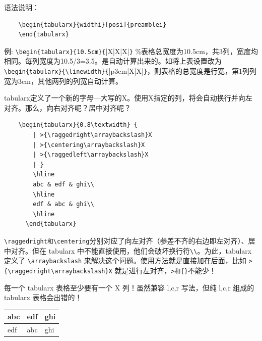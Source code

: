 语法说明：
\begin{lstlisting}
    \begin{tabularx}{widthi}[posi]{preamblei}
    \end{tabularx}
\end{lstlisting}

例: \verb|\begin{tabularx}{10.5cm}{||X|X|X|\verb|}| \%表格总宽度为10.5cm，共3列，宽度均相同。每列宽度为10.5/3=3.5。是自动计算出来的。如将上表设置改为\verb|\begin{tabularx}{\linewidth}{||p{3cm}|X|X|\verb|}|，则表格的总宽度是行宽，第1列列宽为3cm，其他两列的列宽自动计算。

tabularx定义了一个新的字母---大写的X。使用X指定的列，将会自动换行并向左对齐。那么，向右对齐呢？居中对齐呢？

\begin{lstlisting}
    \begin{tabularx}{0.8\textwidth} { 
        | >{\raggedright\arraybackslash}X 
        | >{\centering\arraybackslash}X 
        | >{\raggedleft\arraybackslash}X 
        | }
        \hline
        abc & edf & ghi\\
        \hline
        edf & abc & ghi\\
        \hline
      \end{tabularx}
\end{lstlisting}

\verb|\raggedright和\centering|分别对应了向左对齐（参差不齐的右边即左对齐）、居中对齐。但在 tabularx 中不能直接使用，他们会破坏换行符\verb|\\|。为此，tabularx 定义了 \verb|\arraybackslash| 来解决这个问题。使用方法就是直接加在后面，比如 \verb|>{\raggedright\arraybackslash}X| 就是进行左对齐，\verb|>和{}|不能少！

每一个 tabularx 表格至少要有一个 X 列！虽然兼容 l,c,r 写法，但纯 l,c,r 组成的 tabularx 表格会出错的！

\begin{table}[h]
    \centering
    \begin{tabularx}{0.8\textwidth} { 
        | >{\raggedright\arraybackslash}X 
        | >{\centering\arraybackslash}X 
        | >{\raggedleft\arraybackslash}X 
        | }
        \hline
        abc & edf & ghi\\
        \hline
        edf & abc & ghi\\
        \hline
    \end{tabularx}
\end{table}

